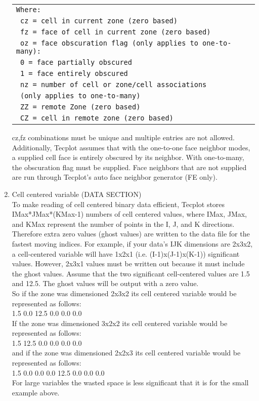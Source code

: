 \documentclass[lang=cn,11pt,a4paper]{elegantpaper}
\begin{document}
\begin{enumerate}
\begin{table}[!htb]
  \centering
  \begin{tabular}{*{1}{l}}
   \texttt{Where:} \\
   \texttt{  cz = cell in current zone (zero based)} \\
   \texttt{  fz = face of cell in current zone (zero based)} \\
   \texttt{  oz = face obscuration flag (only applies to one-to-many):} \\
   \texttt{    0 = face partially obscured} \\
   \texttt{    1 = face entirely obscured} \\
   \texttt{  nz = number of cell or zone/cell associations} \\
   \texttt{    (only applies to one-to-many)} \\
   \texttt{  ZZ = remote Zone (zero based)} \\
   \texttt{  CZ = cell in remote zone (zero based)} \\
   \end{tabular}
\end{table}
 cz,fz combinations must be unique and multiple entries are not allowed. 
 Additionally, Tecplot assumes that with the one-to-one face neighbor modes, 
 a supplied cell face is entirely obscured by its neighbor. 
 With one-to-many, the obscuration flag must be supplied.
 Face neighbors that are not supplied are run through
 Tecplot’s auto face neighbor generator (FE only).

 \item 
 Cell centered variable (DATA SECTION)\\
 To make reading of cell centered binary data efficient, Tecplot stores
 IMax*JMax*(KMax-1) numbers of cell centered values, where IMax, JMax,
 and KMax represent the number of points in the I, J, and K directions.
 Therefore extra zero values (ghost values) are written to the data file
 for the fastest moving indices. For example, if your data's IJK
 dimensions are 2x3x2, a cell-centered variable will have 1x2x1
 (i.e. (I-1)x(J-1)x(K-1)) significant values. However, 2x3x1 values must
 be written out because it must include the ghost values. Assume that the
 two significant cell-centered values are 1.5 and 12.5. The ghost values
 will be output with a zero value.\\
 So if the zone was dimensioned 2x3x2 its cell centered variable would be
 represented as follows:\\
 1.5 0.0 12.5 0.0 0.0 0.0\\
 If the zone was dimensioned 3x2x2 its cell centered variable would be
 represented as follows:\\
 1.5 12.5 0.0 0.0 0.0 0.0\\
 and if the zone was dimensioned 2x2x3 its cell centered variable would be
 represented as follows:\\
 1.5 0.0 0.0 0.0 12.5 0.0 0.0 0.0\\
 For large variables the wasted space is less significant that it
 is for the small example above.
\end{enumerate}
\end{document}
